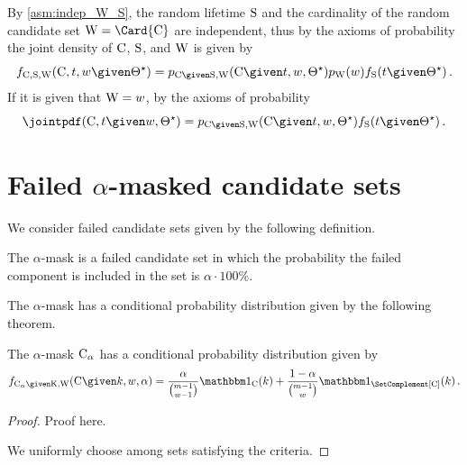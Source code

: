 \documentclass[../main.tex]{subfiles}
\begin{document}
By \cref{asm:indep_W_S}, the random lifetime $\mathrm{S}$ and the cardinality of the random candidate set $\RV{W} = \Card{\rvcand}$ are independent, thus by the axioms of probability the joint density of $\mathrm{C}$, $\mathrm{S}$, and $\mathrm{W}$ is given by
\begin{equation}
\label{eq:general_joint_w_cand_likelihood}
\pdf_{\rvcand, \sv, \RV{W}}(\cand, t, w \given \tparam\sysparam) = \pmf_{\rvcand \given \sv, \RV{W}}(\cand \given t, w, \tparam\sysparam) \pmf_{\RV{W}}(w) \spdf(t \given \tparam\sysparam)\,.
\end{equation}
If it is given that $\mathrm{W} = w$, by the axioms of probability
\begin{equation}
\label{eq:general_joint_cond_w_cand_likelihood}
\jointpdf(\cand, t \given w, \tparam\sysparam) =
\pmf_{\rvcand \given \sv, \RV{W}}(\cand \given t, w, \tparam\sysparam) \spdf(t \given \tparam\sysparam)\,.
\end{equation}


\section{Failed $\alpha$-masked candidate sets}
We consider failed candidate sets given by the following definition.
\begin{definition}
The $\alpha$-mask is a failed candidate set in which the probability the failed component is included in the set is $\alpha \cdot 100 \%$.
\end{definition}

The $\alpha$-mask has a conditional probability distribution given by the following theorem.
\begin{theorem}
The $\alpha$-mask $\mathrm{C}_\alpha$ has a conditional probability distribution given by
\begin{equation}
\pdf_{\rvcand_\alpha \given \RV{K}, \RV{W}}(\cand \given k, w, \alpha) = \frac{\alpha}{\binom{m-1}{w-1}} \SetIndicator{\cand}(k) + \frac{1-\alpha}{\binom{m-1}{w}} \SetIndicator{\SetComplement[\cand]}(k)\,.
\end{equation}
\end{theorem}
\begin{proof}
	Proof here.
	
	We uniformly choose among sets satisfying the criteria.
\end{proof}
\end{document}
